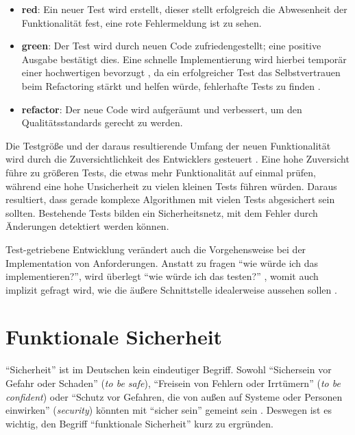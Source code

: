 \begin{itemize}
	\item \textbf{red}: Ein neuer Test wird erstellt, dieser stellt erfolgreich die Abwesenheit der Funktionalität fest, eine rote Fehlermeldung ist zu sehen.
	\item \textbf{green}: Der Test wird durch neuen Code zufriedengestellt; eine positive Ausgabe bestätigt dies. Eine schnelle Implementierung wird hierbei temporär einer hochwertigen bevorzugt \cite[24]{tdd}, da ein erfolgreicher Test das Selbstvertrauen beim Refactoring stärkt und helfen würde, fehlerhafte Tests zu finden \cite[152]{tdd}.
	\item \textbf{refactor}: Der neue Code wird aufgeräumt und verbessert, um den Qualitätsstandards gerecht zu werden.
\end{itemize}

Die Testgröße und der daraus resultierende Umfang der neuen Funktionalität wird durch die Zuversichtlichkeit des Entwicklers gesteuert \cite[42]{tdd}.
Eine hohe Zuversicht führe zu größeren Tests, die etwas mehr Funktionalität auf einmal prüfen, während eine hohe Unsicherheit zu vielen kleinen Tests führen würden.
Daraus resultiert, dass gerade komplexe Algorithmen mit vielen Tests abgesichert sein sollten.
Bestehende Tests bilden ein Sicherheitsnetz, mit dem Fehler durch Änderungen detektiert werden können.

Test-getriebene Entwicklung verändert auch die Vorgehensweise bei der Implementation von Anforderungen. Anstatt zu fragen \enquote{wie würde ich das implementieren?}, wird überlegt \enquote{wie würde ich das testen?} \cite[39]{tdd}, womit auch implizit gefragt wird, wie die äußere Schnittstelle idealerweise aussehen sollen \cite[4]{tdd}.





\section{Funktionale Sicherheit}
\label{com:safety}

\enquote{Sicherheit} ist im Deutschen kein eindeutiger Begriff.
Sowohl \enquote{Sichersein vor Gefahr oder Schaden} (\textit{to be safe}), \enquote{Freisein von Fehlern oder Irrtümern} (\textit{to be confident}) oder \enquote{Schutz vor Gefahren, die von außen auf Systeme oder Personen einwirken} (\textit{security}) könnten mit \enquote{sicher sein} gemeint sein \cite[5-6]{safety}.
Deswegen ist es wichtig, den Begriff \enquote{funktionale Sicherheit} kurz zu ergründen.

